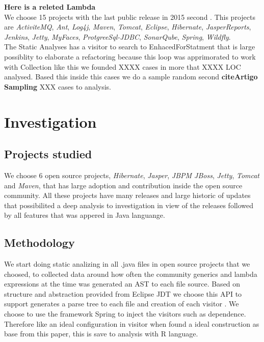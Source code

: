 \documentclass{sig-alternate-05-2015}
\begin{document}
\textbf{Here is a releted Lambda}\\
We choose 15 projects with the last public release in 2015 second \cite{openlogic}. This projects are \textit{ActiviteMQ}, \textit{Ant}, \textit{Log4j}, \textit{Maven}, \textit{Tomcat}, \textit{Eclipse}, \textit{Hibernate}, \textit{JasperReports}, \textit{Jenkins}, \textit{Jetty}, \textit{MyFaces}, \textit{ProtgreeSql-JDBC}, \textit{SonarQube}, \textit{Spring}, \textit{Wildfly}.\\

The Static Analyses has a visitor to search to EnhacedForStatment that is large possiblity to elaborate a refactoring because this loop was apprimorated to work with Collection like this we founded XXXX cases  in more that XXXX LOC analysed. Based this inside this cases we do a sample random second \textbf{cite{Artigo Sampling}} XXX cases to analysis.\\

\section{Investigation}

\subsection{Projects studied}
We choose 6 open source projects, \textit{Hibernate}, \textit{Jasper}, \textit{JBPM JBoss}, \textit{Jetty}, \textit{Tomcat} and \textit{Maven}, that has large adoption and contribution inside the open source community. All these projects have many releases and large historic of updates that possibilited a deep analysis to investigation in view of the releases followed by all features that was appered in Java languange.

\subsection{Methodology}
We start doing static analizing in all .java files in open source projects that we choosed, to collected data around how often the community generics and lambda expressions at the time was generated an AST to each file source. Based on structure and abstraction provided from Eclipse JDT we choose this API to support generates a parse tree to each file and creation of each visitor \cite{Gamma:1995:DPE:186897}. We choose to use the framework Spring to inject the visitors such as dependence. Therefore like an ideal configuration in visitor \cite{Gamma:1995:DPE:186897} when found a ideal construction as base from this paper, this is save to analysis with R language.
  
\end{document}
